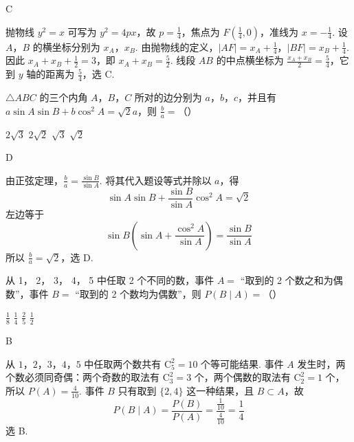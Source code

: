 \begin{answer}
C
\end{answer}

\begin{solution}
抛物线 \(y^{2}=x\) 可写为 \(y^{2}=4px\)，故 \(p=\frac14\)，焦点为 \(F\left(\frac14,0\right)\)，准线为 \(x=-\frac14\). 设 \(A\)，\(B\) 的横坐标分别为 \(x_A\)，\(x_B\). 由抛物线的定义，\(|AF|=x_A+\frac14\)，\(|BF|=x_B+\frac14\).
因此 \(x_A+x_B+\frac12=3\)，即 \(x_A+x_B=\frac52\). 线段 \(AB\) 的中点横坐标为 \(\frac{x_A+x_B}{2}=\frac54\)，它到 \(y\) 轴的距离为 \(\frac54\)，选 C.
\end{solution}

\begin{problem}
\(\triangle ABC\) 的三个内角 \(A\)，\(B\)，\(C\) 所对的边分别为 \(a\)，\(b\)，\(c\)，并且有 \(a \sin A \sin B + b \cos^2 A = \sqrt{2} a\)，则 \(\frac{b}{a} =\)（\quad）

\choices
    {\(2 \sqrt{3}\)}
    {\(2 \sqrt{2}\)}
    {\(\sqrt{3}\)}
    {\(\sqrt{2}\)}
\end{problem}

\begin{answer}
D
\end{answer}

\begin{solution}
由正弦定理，\(\frac ba=\frac{\sin B}{\sin A}\). 将其代入题设等式并除以 \(a\)，得
\[
\sin A\sin B+\frac{\sin B}{\sin A}\cos^{2}A=\sqrt2
\]
左边等于
\[
\sin B\left(\sin A+\frac{\cos^{2}A}{\sin A}\right)=\frac{\sin B}{\sin A}
\]
所以 \(\frac ba=\sqrt2\)，选 D.
\end{solution}

\begin{problem}
从 1， 2， 3， 4， 5 中任取 2 个不同的数，事件 \(A =\) “取到的 2 个数之和为偶数”，事件 \(B =\) “取到的 2 个数均为偶数”，则 \( P(B \mid A) = \)（\quad）

\choices
    {\(\frac{1}{8}\)}
    {\(\frac{1}{4}\)}
    {\(\frac{2}{5}\)}
    {\(\frac{1}{2}\)}
\end{problem}

\begin{answer}
B
\end{answer}

\begin{solution}
从 \(1\)，\(2\)，\(3\)，\(4\)，\(5\) 中任取两个数共有 \(\mathrm C_5^2=10\) 个等可能结果. 事件 \(A\) 发生时，两个数必须同奇偶：两个奇数的取法有 \(\mathrm C_3^2=3\) 个，两个偶数的取法有 \(\mathrm C_2^2=1\) 个，所以 \(P(A)=\frac4{10}\). 事件 \(B\) 只有取到 \(\{2,4\}\) 这一种结果，且 \(B\subset A\)，故
\[
P(B\mid A)=\frac{P(B)}{P(A)}=\frac{\frac{1}{10}}{\frac{4}{10}}=\frac14
\]
选 B.
\end{solution}

